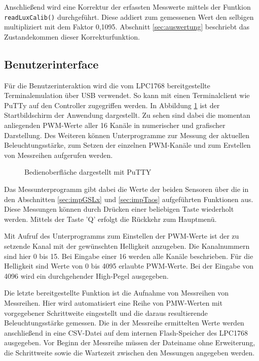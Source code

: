 \documentclass[a4paper,12pt]{scrartcl}
\begin{document}
Anschließend wird eine Korrektur der erfassten Messwerte mittels der Funtkion \texttt{readLuxCalib()} durchgeführt. Diese addiert zum gemessenen Wert den selbigen multipliziert mit dem Faktor 0,1095. Abschnitt \ref{sec:auswertung} beschriebt das Zustandekommen dieser Korrekturfunktion.

\subsection{Benutzerinterface}
Für die Benutzerinteraktion wird die vom LPC1768 bereitgestellte Terminalemulation über USB verwendet. So kann mit einen Terminalclient wie PuTTy auf den Controller zugegriffen werden. In Abbildung \ref{fig:gui} ist der Startbildschirm der Anwendung dargestellt. Zu sehen sind dabei die momentan anliegenden PWM-Werte aller 16 Kanäle in numerischer und grafischer Darstellung. Des Weiteren können Unterprogramme zur Messung der aktuellen Beleuchtungsstärke, zum Setzen der einzelnen PWM-Kanäle und zum Erstellen von Messreihen aufgerufen werden.

\begin{figure}[htb]
\begin{center}
\end{center}
\caption[Bedienoberfläche dargestellt mit PuTTY, Quelle: Autoren]{\label{fig:gui}Bedienoberfläche dargestellt mit PuTTY}
\end{figure}

Das Messunterprogramm gibt dabei die Werte der beiden Sensoren über die in den Abschnitten \ref{sec:impGSLx} und \ref{sec:impTaos} aufgeführten Funktionen aus. Diese Messungen können durch Drücken einer beliebigen Taste wiederholt werden. Mittels der Taste ’Q’ erfolgt die Rückkehr zum Hauptmenü.

Mit Aufruf des Unterprogramms zum Einstellen der PWM-Werte ist der zu setzende Kanal mit der gewünschten Helligkeit anzugeben. Die Kanalnummern sind hier 0 bis 15. Bei Eingabe einer 16 werden alle Kanäle beschrieben. Für die Helligkeit sind Werte von 0 bis 4095 erlaubte PWM-Werte. Bei der Eingabe von 4096 wird ein durchgehender High-Pegel ausgegeben.

Die letzte bereitgestellte Funktion ist die Aufnahme von Messreihen von Messreihen. Hier wird automatisiert eine Reihe von PMW-Werten mit vorgegebener Schrittweite eingestellt und die daraus resultierende Beleuchtungsstärke gemessen. Die in der Messreihe ermittelten Werte werden anschließend in eine CSV-Datei auf dem internen Flash-Speicher des LPC1768 ausgegeben. Vor Beginn der Messreihe müssen der Dateiname ohne Erweiterung, die Schrittweite sowie die Wartezeit zwischen den Messungen angegeben werden.
\end{document}
